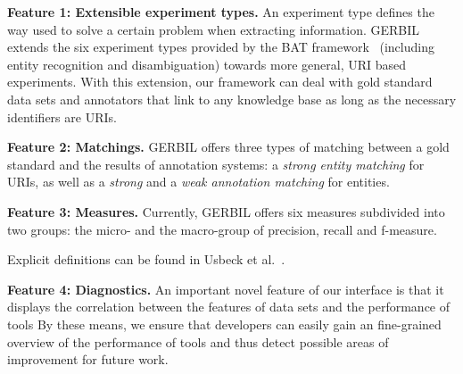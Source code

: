 \textbf{Feature 1: Extensible experiment types.}
An experiment type defines the way used to solve a certain problem when extracting information.
GERBIL extends the six experiment types provided by the BAT framework~\cite{cornolti} (including entity recognition and disambiguation) towards more general, URI based experiments.
With this extension, our framework can deal with gold standard data sets and annotators that link to any knowledge base as long as the necessary identifiers are URIs.

\textbf{Feature 2: Matchings.}
GERBIL offers three types of matching between a gold standard and the results of annotation systems: a \emph{strong entity matching} for URIs, as well as a  \emph{strong} and a \emph{weak annotation matching} for entities.

\textbf{Feature 3: Measures.}
Currently, GERBIL offers six measures subdivided into two groups: the micro- and the macro-group of precision, recall and f-measure. %

Explicit definitions can be found in Usbeck et al.~\cite{GERBIL}.

\textbf{Feature 4: Diagnostics.}
An important novel feature of our interface is that it displays the correlation between the features of data sets and the performance of tools %
By these means, we ensure that developers can easily gain an fine-grained overview of the performance of tools
and thus detect possible areas of improvement for future work. 

